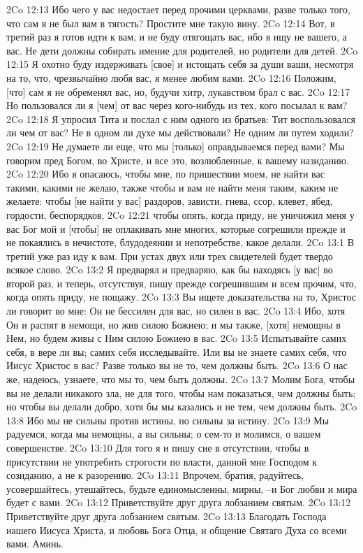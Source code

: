 2Co 12:13  Ибо чего у вас недостает перед прочими церквами, разве только того, что сам я не был вам в тягость? Простите мне такую вину.
2Co 12:14  Вот, в третий раз я готов идти к вам, и не буду отягощать вас, ибо я ищу не вашего, а вас. Не дети должны собирать имение для родителей, но родители для детей.
2Co 12:15  Я охотно буду издерживать [свое] и истощать себя за души ваши, несмотря на то, что, чрезвычайно любя вас, я менее любим вами.
2Co 12:16  Положим, [что] сам я не обременял вас, но, будучи хитр, лукавством брал с вас.
2Co 12:17  Но пользовался ли я [чем] от вас через кого-нибудь из тех, кого посылал к вам?
2Co 12:18  Я упросил Тита и послал с ним одного из братьев: Тит воспользовался ли чем от вас? Не в одном ли духе мы действовали? Не одним ли путем ходили?
2Co 12:19  Не думаете ли еще, что мы [только] оправдываемся перед вами? Мы говорим пред Богом, во Христе, и все это, возлюбленные, к вашему назиданию.
2Co 12:20  Ибо я опасаюсь, чтобы мне, по пришествии моем, не найти вас такими, какими не желаю, также чтобы и вам не найти меня таким, каким не желаете: чтобы [не найти у вас] раздоров, зависти, гнева, ссор, клевет, ябед, гордости, беспорядков,
2Co 12:21  чтобы опять, когда приду, не уничижил меня у вас Бог мой и [чтобы] не оплакивать мне многих, которые согрешили прежде и не покаялись в нечистоте, блудодеянии и непотребстве, какое делали.
2Co 13:1  В третий уже раз иду к вам. При устах двух или трех свидетелей будет твердо всякое слово.
2Co 13:2  Я предварял и предваряю, как бы находясь [у вас] во второй раз, и теперь, отсутствуя, пишу прежде согрешившим и всем прочим, что, когда опять приду, не пощажу.
2Co 13:3  Вы ищете доказательства на то, Христос ли говорит во мне: Он не бессилен для вас, но силен в вас.
2Co 13:4  Ибо, хотя Он и распят в немощи, но жив силою Божиею; и мы также, [хотя] немощны в Нем, но будем живы с Ним силою Божиею в вас.
2Co 13:5  Испытывайте самих себя, в вере ли вы; самих себя исследывайте. Или вы не знаете самих себя, что Иисус Христос в вас? Разве только вы не то, чем должны быть.
2Co 13:6  О нас же, надеюсь, узнаете, что мы то, чем быть должны.
2Co 13:7  Молим Бога, чтобы вы не делали никакого зла, не для того, чтобы нам показаться, чем должны быть; но чтобы вы делали добро, хотя бы мы казались и не тем, чем должны быть.
2Co 13:8  Ибо мы не сильны против истины, но сильны за истину.
2Co 13:9  Мы радуемся, когда мы немощны, а вы сильны; о сем-то и молимся, о вашем совершенстве.
2Co 13:10  Для того я и пишу сие в отсутствии, чтобы в присутствии не употребить строгости по власти, данной мне Господом к созиданию, а не к разорению.
2Co 13:11  Впрочем, братия, радуйтесь, усовершайтесь, утешайтесь, будьте единомысленны, мирны, --и Бог любви и мира будет с вами.
2Co 13:12  Приветствуйте друг друга лобзанием святым.
2Co 13:12  Приветствуйте друг друга лобзанием святым.
2Co 13:13  Благодать Господа нашего Иисуса Христа, и любовь Бога Отца, и общение Святаго Духа со всеми вами. Аминь.


